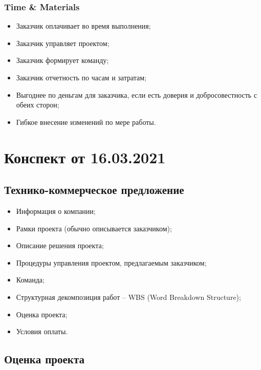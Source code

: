 \documentclass[a4paper,8pt]{article}
\begin{document}
\subsubsection{Time \& Materials}

    \begin{itemize}
        \item Заказчик оплачивает во время выполнения;
        \item Заказчик управляет проектом;
        \item Заказчик формирует команду;
        \item Заказчик отчетность по часам и затратам;
        \item Выгоднее по деньгам для заказчика, если есть доверия и добросовестность с обеих сторон;
        \item Гибкое внесение изменений по мере работы.
    \end{itemize}


\newpage
\section{Конспект от 16.03.2021}




\subsection{Технико-коммерческое предложение}

    \begin{itemize}
        \item Информация о компании;
        \item Рамки проекта (обычно описывается заказчиком);
        \item Описание решения проекта;
        \item Процедуры управления проектом, предлагаемым заказчиком;
        \item Команда;
        \item Структурная декомпозиция работ -- WBS (Word Breakdown Structure);
        \item Оценка проекта;
        \item Условия оплаты.
    \end{itemize}


\subsection{Оценка проекта}
\end{document}
